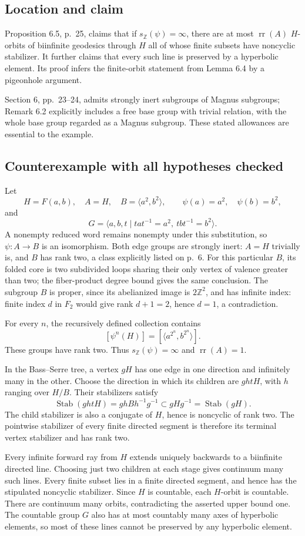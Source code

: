 \documentclass[10pt]{article}
\begin{document}
\subsection*{Location and claim}
Proposition 6.5, p. 25, claims that if \(s_{\mathbb Z}(\psi)=\infty\), there are at most \(\operatorname{rr}(A)\) \(H\)-orbits of biinfinite geodesics through \(H\) all of whose finite subsets have noncyclic stabilizer. It further claims that every such line is preserved by a hyperbolic element. Its proof infers the finite-orbit statement from Lemma 6.4 by a pigeonhole argument.\par
Section 6, pp. 23–24, admits strongly inert subgroups of Magnus subgroups; Remark 6.2 explicitly includes a free base group with trivial relation, with the whole base group regarded as a Magnus subgroup. These stated allowances are essential to the example.\par
\subsection*{Counterexample with all hypotheses checked}
Let \[H=F(a,b),\quad A=H,\quad B=\langle a^2,b^2\rangle,\qquad
 \psi(a)=a^2,\quad\psi(b)=b^2,\] and \[G=\langle a,b,t\mid tat^{-1}=a^2,\ tbt^{-1}=b^2\rangle .\] A nonempty reduced word remains nonempty under this substitution, so \(\psi:A\to B\) is an isomorphism. Both edge groups are strongly inert: \(A=H\) trivially is, and \(B\) has rank two, a class explicitly listed on p. 6. For this particular \(B\), its folded core is two subdivided loops sharing their only vertex of valence greater than two; the fiber-product degree bound gives the same conclusion. The subgroup \(B\) is proper, since its abelianized image is \(2\mathbb Z^2\), and has infinite index: finite index \(d\) in \(F_2\) would give rank \(d+1=2\), hence \(d=1\), a contradiction.\par
For every \(n\), the recursively defined collection contains \[[\psi^n(H)]=[\langle a^{2^n},b^{2^n}\rangle].\] These groups have rank two. Thus \(s_{\mathbb Z}(\psi)=\infty\) and \(\operatorname{rr}(A)=1\).\par
In the Bass–Serre tree, a vertex \(gH\) has one edge in one direction and infinitely many in the other. Choose the direction in which its children are \(ghtH\), with \(h\) ranging over \(H/B\). Their stabilizers satisfy \[\operatorname{Stab}(ghtH)=ghBh^{-1}g^{-1}
       \subset gHg^{-1}=\operatorname{Stab}(gH).\] The child stabilizer is also a conjugate of \(H\), hence is noncyclic of rank two. The pointwise stabilizer of every finite directed segment is therefore its terminal vertex stabilizer and has rank two.\par
Every infinite forward ray from \(H\) extends uniquely backwards to a biinfinite directed line. Choosing just two children at each stage gives continuum many such lines. Every finite subset lies in a finite directed segment, and hence has the stipulated noncyclic stabilizer. Since \(H\) is countable, each \(H\)-orbit is countable. There are continuum many orbits, contradicting the asserted upper bound one. The countable group \(G\) also has at most countably many axes of hyperbolic elements, so most of these lines cannot be preserved by any hyperbolic element.\par
\end{document}

